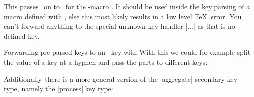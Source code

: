 \begin{function}{\ekvcPass}
  \begin{syntax}
  \end{syntax}
  This passes \val\ on to \key\ for the \expkvc-macro . It should be
  used inside the key parsing of a macro defined with \expkvc, else this most
  likely results in a low level \TeX\ error. You can't forward anything to the
  special unknown key handler |...| as that is no defined key.
\end{function}
\begin{example}
    {Forwarding pre-parsed keys to an \expkvc\ key with }
  With this we could for example split the value of a key at a hyphen and pass
  the parts to different keys:
  \begin{enverb}
    \ekvcSplit{}
    \def\fooSplit#1-#2\par
      {\ekvcPass{}\ekvcPass{}}
    \foo{}
  \end{enverb}
\end{example}

Additionally, there is a more general version of the |aggregate| secondary key
type, namely the |process| key type:

